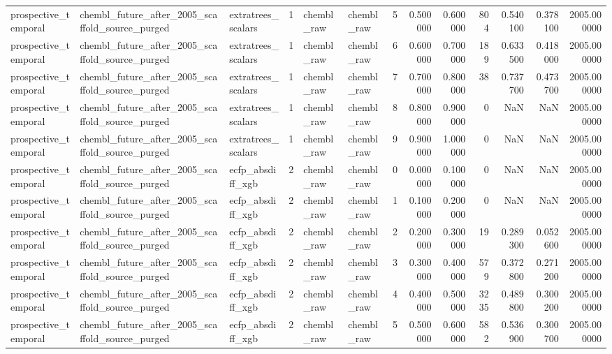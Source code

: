 \begin{longtable}{lllrllrrrrrrr}
prospective\_temporal & chembl\_future\_after\_2005\_scaffold\_source\_purged & extratrees\_scalars & 1 & chembl\_raw & chembl\_raw & 5 & 0.500000 & 0.600000 & 804 & 0.540100 & 0.378100 & 2005.000000 \\
prospective\_temporal & chembl\_future\_after\_2005\_scaffold\_source\_purged & extratrees\_scalars & 1 & chembl\_raw & chembl\_raw & 6 & 0.600000 & 0.700000 & 189 & 0.633500 & 0.418000 & 2005.000000 \\
prospective\_temporal & chembl\_future\_after\_2005\_scaffold\_source\_purged & extratrees\_scalars & 1 & chembl\_raw & chembl\_raw & 7 & 0.700000 & 0.800000 & 38 & 0.737700 & 0.473700 & 2005.000000 \\
prospective\_temporal & chembl\_future\_after\_2005\_scaffold\_source\_purged & extratrees\_scalars & 1 & chembl\_raw & chembl\_raw & 8 & 0.800000 & 0.900000 & 0 & NaN & NaN & 2005.000000 \\
prospective\_temporal & chembl\_future\_after\_2005\_scaffold\_source\_purged & extratrees\_scalars & 1 & chembl\_raw & chembl\_raw & 9 & 0.900000 & 1.000000 & 0 & NaN & NaN & 2005.000000 \\
prospective\_temporal & chembl\_future\_after\_2005\_scaffold\_source\_purged & ecfp\_absdiff\_xgb & 2 & chembl\_raw & chembl\_raw & 0 & 0.000000 & 0.100000 & 0 & NaN & NaN & 2005.000000 \\
prospective\_temporal & chembl\_future\_after\_2005\_scaffold\_source\_purged & ecfp\_absdiff\_xgb & 2 & chembl\_raw & chembl\_raw & 1 & 0.100000 & 0.200000 & 0 & NaN & NaN & 2005.000000 \\
prospective\_temporal & chembl\_future\_after\_2005\_scaffold\_source\_purged & ecfp\_absdiff\_xgb & 2 & chembl\_raw & chembl\_raw & 2 & 0.200000 & 0.300000 & 19 & 0.289300 & 0.052600 & 2005.000000 \\
prospective\_temporal & chembl\_future\_after\_2005\_scaffold\_source\_purged & ecfp\_absdiff\_xgb & 2 & chembl\_raw & chembl\_raw & 3 & 0.300000 & 0.400000 & 579 & 0.372800 & 0.271200 & 2005.000000 \\
prospective\_temporal & chembl\_future\_after\_2005\_scaffold\_source\_purged & ecfp\_absdiff\_xgb & 2 & chembl\_raw & chembl\_raw & 4 & 0.400000 & 0.500000 & 3235 & 0.489800 & 0.300200 & 2005.000000 \\
prospective\_temporal & chembl\_future\_after\_2005\_scaffold\_source\_purged & ecfp\_absdiff\_xgb & 2 & chembl\_raw & chembl\_raw & 5 & 0.500000 & 0.600000 & 582 & 0.536900 & 0.300700 & 2005.000000 \\

\end{longtable}
